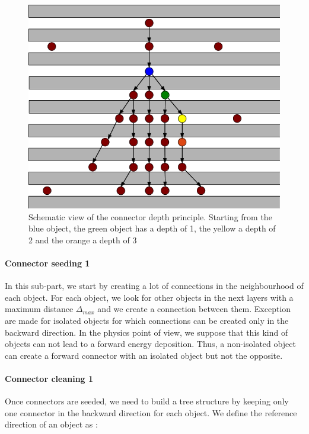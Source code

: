 \documentclass[cits]{JINST}
\begin{document}
\begin{figure}
  \vspace{-30pt}
  \begin{center}
    \includegraphics[width=\linewidth]{ArborConnectorDepth.png}
  \end{center}
  \vspace{-10pt}
  \caption{\label{ARBOR_CONNECTOR_DEPTH} Schematic view of the connector depth principle. Starting from the blue object, the green object has a depth of 1, the yellow a depth of 2 and the orange a depth of 3}
  \vspace{-30pt}
\end{figure}

\paragraph*{Connector seeding 1} In this sub-part, we start by creating a lot of connections in the neighbourhood of each object. For each object, we look for other objects in the next layers with a maximum distance $\Delta_{max}$ and we create a connection between them. Exception are made for isolated objects for which connections can be created only in the backward direction. In the physics point of view, we suppose that this kind of objects can not lead to a forward energy deposition. Thus, a non-isolated object can create a forward connector with an isolated object but not the opposite.

\paragraph*{Connector cleaning 1} Once connectors are seeded, we need to build a tree structure by keeping only one connector in the backward direction for each object. We define the reference direction of an object as :
\end{document}
